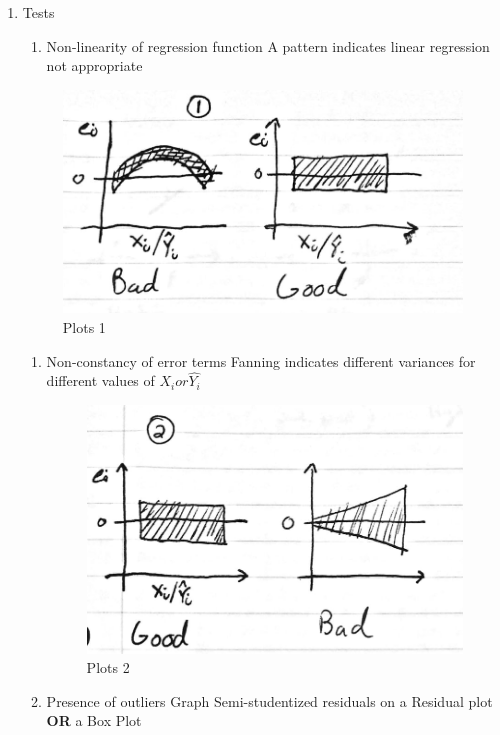 \documentclass[11pt]{article}
\begin{document}
\begin{enumerate}
\item Tests
\label{sec:orga08775a}
\begin{enumerate}
\item Non-linearity of regression function
A pattern indicates linear regression not appropriate
\end{enumerate}

\begin{figure}[htbp]
\centering
\includegraphics[width=.9\linewidth]{./images/resplot_1-1.jpg}
\caption{\label{fig:orgbfe0970}
Plots 1}
\end{figure}
\begin{enumerate}
\item Non-constancy of error terms
Fanning indicates different variances for different values of \(X_i or \hat{Y_i}\)

\begin{figure}[htbp]
\centering
\includegraphics[width=.9\linewidth]{./images/resplot_2-1.jpg}
\caption{\label{fig:orgb777600}
Plots 2}
\end{figure}
\item Presence of outliers
Graph Semi-studentized residuals on a Residual plot \textbf{OR} a Box Plot


\end{enumerate}
\end{enumerate}
\end{document}
